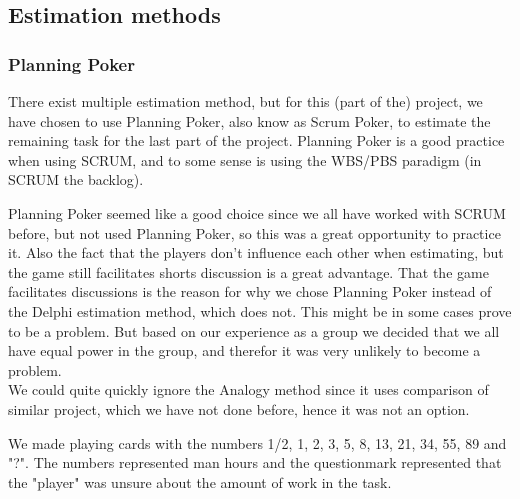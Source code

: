 \subsection{Estimation methods}
\subsubsection{Planning Poker}
There exist multiple estimation method, but for this (part of the) project, we have chosen to use Planning Poker, also know as Scrum Poker, to estimate the remaining task for the last part of the project. Planning Poker is a good practice when using SCRUM, and to some sense is using the WBS/PBS paradigm (in SCRUM the backlog).

Planning Poker seemed like a good choice since we all have worked with SCRUM before, but not used Planning Poker, so this was a great opportunity to practice it. Also the fact that the players don't influence each other when estimating, but the game still facilitates shorts discussion is a great advantage. That the game facilitates discussions is the reason for why we chose Planning Poker instead of the Delphi estimation method, which does not. This might be in some cases prove to be a problem. But based on our experience as a group we decided that we all have equal power in the group, and therefor it was very unlikely to become a problem. \\
We could quite quickly ignore the Analogy method since it uses comparison of similar project, which we have not done before, hence it was not an option.

We made playing cards with the numbers 1/2, 1, 2, 3, 5, 8, 13, 21, 34, 55, 89 and "?". The numbers represented man hours and the questionmark represented that the "player" was unsure about the amount of work in the task.
